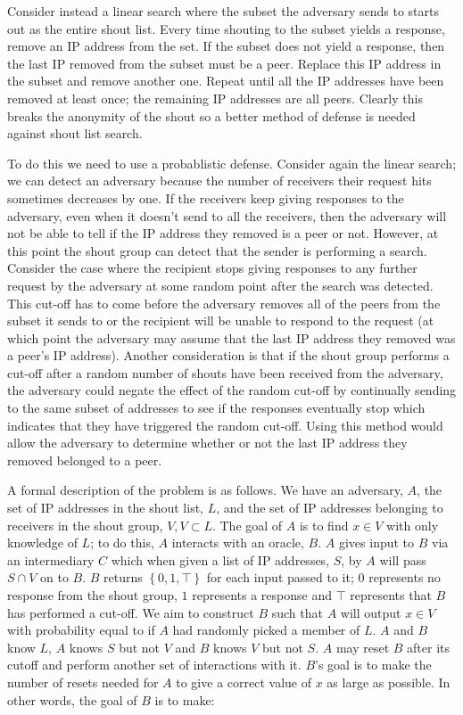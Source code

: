 \documentclass[ %
                    author={Luke Murray},
                supervisor={Dr. Simon Hollis},
                     title={Shadow Peer-to-Peer Networks},
                  subtitle={},
                    degree={MEng},
                      year={2013} ]{thesis}
\begin{document}
Consider instead a linear search where the subset the adversary sends to starts out as the entire shout list. Every time shouting to the subset yields a response, remove an IP address from the set. If the subset does not yield a response, then the last IP removed from the subset must be a peer. Replace this IP address in the subset and remove another one. Repeat until all the IP addresses have been removed at least once; the remaining IP addresses are all peers. Clearly this breaks the anonymity of the shout so a better method of defense is needed against shout list search.

To do this we need to use a probablistic defense. Consider again the linear search; we can detect an adversary because the number of receivers their request hits sometimes decreases by one. If the receivers keep giving responses to the adversary, even when it doesn't send to all the receivers, then the adversary will not be able to tell if the IP address they removed is a peer or not. However, at this point the shout group can detect that the sender is performing a search. Consider the case where the recipient stops giving responses to any further request by the adversary at some random point after the search was detected. This cut-off has to come before the adversary removes all of the peers from the subset it sends to or the recipient will be unable to respond to the request (at which point the adversary may assume that the last IP address they removed was a peer's IP address). Another consideration is that if the shout group performs a cut-off after a random number of shouts have been received from the adversary, the adversary could negate the effect of the random cut-off by continually sending to the same subset of addresses to see if the responses eventually stop which indicates that they have triggered the random cut-off. Using this method would allow the adversary to determine whether or not the last IP address they removed belonged to a peer.

A formal description of the problem is as follows. We have an adversary, $A$, the set of IP addresses in the shout list, $L$, and the set of IP addresses belonging to receivers in the shout group, $V, V \subset L$. The goal of $A$ is to find $x \in V$ with only knowledge of $L$; to do this, $A$ interacts with an oracle, $B$. $A$ gives input to $B$ via an intermediary $C$ which when given a list of IP addresses, $S$, by $A$ will pass $S \cap V$ on to $B$. $B$ returns $\left\{0, 1, \top\right\}$ for each input passed to it; $0$ represents no response from the shout group, $1$ represents a response and $\top$ represents that $B$ has performed a cut-off. We aim to construct $B$ such that $A$ will output $x \in V$ with probability equal to if $A$ had randomly picked a member of $L$. $A$ and $B$ know $L$, $A$ knows $S$ but not $V$ and $B$ knows $V$ but not $S$. $A$ may reset $B$ after its cutoff and perform another set of interactions with it. $B$'s goal is to make the number of resets needed for $A$ to give a correct value of $x$ as large as possible. In other words, the goal of $B$ is to make:
\end{document}
